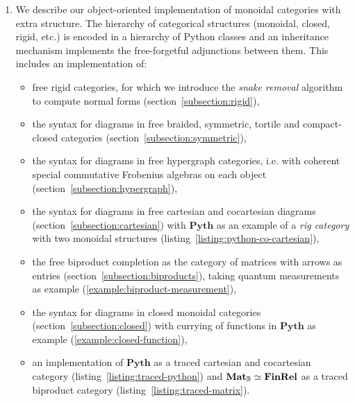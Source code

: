 \begin{enumerate}
\item We describe our object-oriented implementation of monoidal categories with extra structure.
The hierarchy of categorical structures (monoidal, closed, rigid, etc.) is encoded in a hierarchy of Python classes and an inheritance mechanism implements the free-forgetful adjunctions between them.
This includes an implementation of:
\begin{itemize}
\item free rigid categories, for which we introduce the \emph{snake removal} algorithm to compute normal forms (section~\ref{subsection:rigid}),
\item the syntax for diagrams in free braided, symmetric, tortile and compact-closed categories (section~\ref{subsection:symmetric}),
\item the syntax for diagrams in free hypergraph categories, i.e. with coherent special commutative Frobenius algebras on each object (section~\ref{subsection:hypergraph}),
\item the syntax for diagrams in free cartesian and cocartesian diagrams (section~\ref{subsection:cartesian}) with $\mathbf{Pyth}$ as an example of a \emph{rig category} with two monoidal structures (listing~\ref{listing:python-co-cartesian}),
\item the free biproduct completion as the category of matrices with arrows as entries (section~\ref{subsection:biproducts}), taking quantum measurements as example (\ref{example:biproduct-measurement}),
\item the syntax for diagrams in closed monoidal categories (section~\ref{subsection:closed}) with currying of functions in $\mathbf{Pyth}$ as example (\ref{example:closed-function}),
\item an implementation of $\mathbf{Pyth}$ as a traced cartesian and cocartesian category (listing~\ref{listing:traced-python}) and $\mathbf{Mat}_{\mathbb{B}} \simeq \mathbf{FinRel}$ as a traced biproduct category (listing~\ref{listing:traced-matrix}).
\end{itemize}


\end{enumerate}
